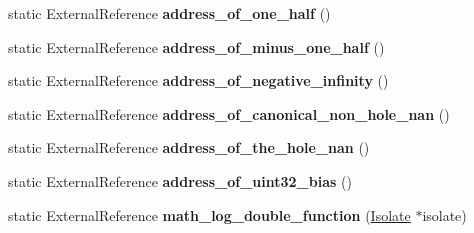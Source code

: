 \begin{DoxyCompactItemize}
\item 
\hypertarget{classv8_1_1internal_1_1_b_a_s_e___e_m_b_e_d_d_e_d_a2bcaaf146bda96ebfb6eddde1612e7d2}{}static External\+Reference {\bfseries address\+\_\+of\+\_\+one\+\_\+half} ()\label{classv8_1_1internal_1_1_b_a_s_e___e_m_b_e_d_d_e_d_a2bcaaf146bda96ebfb6eddde1612e7d2}

\item 
\hypertarget{classv8_1_1internal_1_1_b_a_s_e___e_m_b_e_d_d_e_d_afccee5c33343d06389dc528f663cd028}{}static External\+Reference {\bfseries address\+\_\+of\+\_\+minus\+\_\+one\+\_\+half} ()\label{classv8_1_1internal_1_1_b_a_s_e___e_m_b_e_d_d_e_d_afccee5c33343d06389dc528f663cd028}

\item 
\hypertarget{classv8_1_1internal_1_1_b_a_s_e___e_m_b_e_d_d_e_d_aff012a972299f545b58aa3f13dd92dd1}{}static External\+Reference {\bfseries address\+\_\+of\+\_\+negative\+\_\+infinity} ()\label{classv8_1_1internal_1_1_b_a_s_e___e_m_b_e_d_d_e_d_aff012a972299f545b58aa3f13dd92dd1}

\item 
\hypertarget{classv8_1_1internal_1_1_b_a_s_e___e_m_b_e_d_d_e_d_a915ebc47489b90f8c4487bcf330b6d6f}{}static External\+Reference {\bfseries address\+\_\+of\+\_\+canonical\+\_\+non\+\_\+hole\+\_\+nan} ()\label{classv8_1_1internal_1_1_b_a_s_e___e_m_b_e_d_d_e_d_a915ebc47489b90f8c4487bcf330b6d6f}

\item 
\hypertarget{classv8_1_1internal_1_1_b_a_s_e___e_m_b_e_d_d_e_d_a6f58740fea1d08a36250e5b25bb49d53}{}static External\+Reference {\bfseries address\+\_\+of\+\_\+the\+\_\+hole\+\_\+nan} ()\label{classv8_1_1internal_1_1_b_a_s_e___e_m_b_e_d_d_e_d_a6f58740fea1d08a36250e5b25bb49d53}

\item 
\hypertarget{classv8_1_1internal_1_1_b_a_s_e___e_m_b_e_d_d_e_d_ab3fedf783b4ebb1e44c85961972b5f0b}{}static External\+Reference {\bfseries address\+\_\+of\+\_\+uint32\+\_\+bias} ()\label{classv8_1_1internal_1_1_b_a_s_e___e_m_b_e_d_d_e_d_ab3fedf783b4ebb1e44c85961972b5f0b}

\item 
\hypertarget{classv8_1_1internal_1_1_b_a_s_e___e_m_b_e_d_d_e_d_a9fc27110b6c5a15537987b9584bfe366}{}static External\+Reference {\bfseries math\+\_\+log\+\_\+double\+\_\+function} (\hyperlink{classv8_1_1internal_1_1_isolate}{Isolate} $\ast$isolate)\label{classv8_1_1internal_1_1_b_a_s_e___e_m_b_e_d_d_e_d_a9fc27110b6c5a15537987b9584bfe366}


\end{DoxyCompactItemize}
